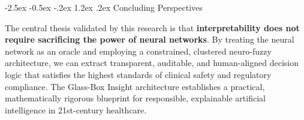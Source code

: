 \documentclass[12pt,a4paper,oneside]{report}
\makeatletter
\renewcommand\section{\@startsection {section}{1}{\z@}%
                                   {-2.5ex \@plus -0.5ex \@minus -.2ex}%
                                   {1.2ex \@plus .2ex}%
                                   {\normalfont\fontsize{13}{16}\selectfont\bfseries}}
\makeatother
\begin{document}
\section{Concluding Perspectives}

The central thesis validated by this research is that \textbf{interpretability does not require sacrificing the power of neural networks}. By treating the neural network as an oracle and employing a constrained, clustered neuro-fuzzy architecture, we can extract transparent, auditable, and human-aligned decision logic that satisfies the highest standards of clinical safety and regulatory compliance. The Glass-Box Insight architecture establishes a practical, mathematically rigorous blueprint for responsible, explainable artificial intelligence in 21st-century healthcare.


\clearpage
\linespread{1.0}\selectfont
\small
\setlength{\itemsep}{1.5pt plus 0.5pt}
\setlength{\parskip}{0pt}
\end{document}
